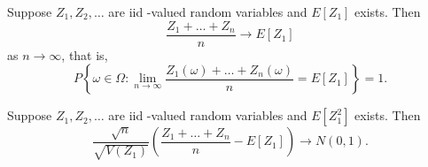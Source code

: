 \begin{theorem} \label{thm:dtmc:slln}
    Suppose $Z_1, Z_2, \dots$ are iid \R-valued random variables and $E[Z_1]$
    exists.
    Then \[
        \frac{Z_1 + \dots + Z_n}{n} \to E[Z_1]
    \] as $n \to \infty$, that is, \[
        P\left\{\omega \in \Omega : \lim_{n \to \infty}
        \frac{Z_1(\omega) + \dots + Z_n(\omega)}{n} = E[Z_1]\right\} = 1.
    \]
\end{theorem}
\begin{theorem} \label{thm:dtmc:wlln}
    
\end{theorem}
\begin{theorem} \label{thm:dtmc:clt}
    Suppose $Z_1, Z_2, \dots$ are iid \R-valued random variables and $E[Z_1^2]$
    exists.
    Then \[
        \frac{\sqrt n}{\sqrt{V(Z_1)}} \left(\frac{Z_1 + \dots + Z_n}{n}
        - E[Z_1]\right) \to N(0, 1).
    \]
\end{theorem}
